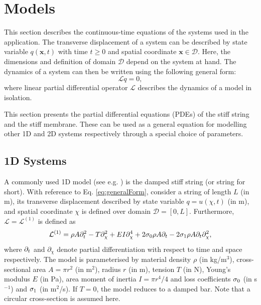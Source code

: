 \documentclass{article}
\begin{document}
\section{Models}\label{sec:models}
This section describes the continuous-time equations of the systems used in the application. The transverse displacement of a system can be described by state variable $q(\boldsymbol{x}, t)$ with time $t\geq 0$ and spatial coordinate $\boldsymbol{x}\in \mathcal{D}$. Here, the dimensions and definition of domain $\mathcal{D}$ depend on the system at hand. The dynamics of a system can then be written using the following general form:
\begin{equation}\label{eq:generalForm}
    \mathcal{L}q = 0,
\end{equation}
where linear partial differential operator $\mathcal{L}$ describes the dynamics of a model in isolation.

This section presents the partial differential equations (PDEs) of the stiff string and the stiff membrane. These can be used as a general equation for modelling other 1D and 2D systems respectively through a special choice of parameters. 


\subsection{1D Systems}
A commonly used 1D model (see e.g. \cite{Willemsen2019, Bilbao2019}) is the damped stiff string (or string for short). With reference to Eq. \eqref{eq:generalForm}, consider a string of length $L$ (in m), its transverse displacement described by state variable $q = u(\chi, t)$ (in m), and spatial coordinate $\chi$ is defined over domain $\mathcal{D} = [0, L]$. Furthermore, $\mathcal{L}=\mathcal{L}^{(\text{1})}$ is defined as \cite{Bensa2003}
\begin{equation}\label{eq:stiffString}
    \mathcal{L}^{(1)}= \rho A\partial_t^2 - T\partial_{\chi}^2 + E I \partial_{\chi}^4 + 2\sigma_{0}\rho A\partial_t - 2 \sigma_{1}\rho A\partial_t\partial_{\chi}^2,
\end{equation}
where $\partial_t$ and $\partial_\chi$ denote partial differentiation with respect to time and space respectively. The model is parameterised by material density $\rho$ (in kg/m$^3$), cross-sectional area $A = \pi r^2$ (in m$^2$), radius $r$ (in m), tension $T$ (in N), Young's modulus $E$ (in Pa), area moment of inertia $I = \pi r^4/4$ and loss coefficients $\sigma_{0}$ (in s$^{-1}$) and $\sigma_{1}$ (in m$^2$/s). If $T=0$, the model reduces to a damped bar. Note that a circular cross-section is assumed here. 
\end{document}
